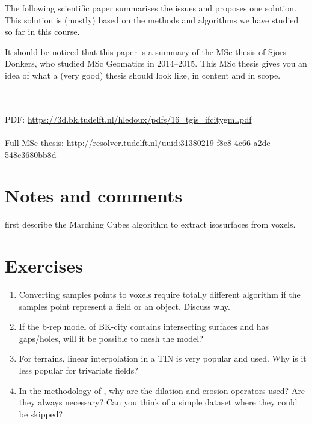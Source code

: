 The following scientific paper summarises the issues and proposes one solution. 
This solution is (mostly) based on the methods and algorithms we have studied so far in this course.

It should be noticed that this paper is a summary of the MSc thesis of Sjors Donkers, who studied MSc Geomatics in 2014--2015.
This MSc thesis gives you an idea of what a (very good) thesis should look like, in content and in scope.

\begin{kaobox}[frametitle=\faExternalLink\ To read or to watch.]
  \\ \\
  PDF: \url{https://3d.bk.tudelft.nl/hledoux/pdfs/16_tgis_ifcitygml.pdf}
  \\ \\
  Full MSc thesis: \url{http://resolver.tudelft.nl/uuid:31380219-f8e8-4c66-a2dc-548c3680bb8d}
\end{kaobox}

%
\section{Notes and comments}

\citet{Lorensen87} first describe the Marching Cubes algorithm to extract isosurfaces from voxels.

%
\section{Exercises}

\begin{enumerate}
  \item Converting samples points to voxels require totally different algorithm if the samples point represent a field or an object. Discuss why.
  \item If the b-rep model of BK-city contains intersecting surfaces and has gaps/holes, will it be possible to mesh the model?
  \item For terrains, linear interpolation in a TIN is very popular and used. Why is it less popular for trivariate fields?
  \item In the methodology of \citet{Donkers16}, why are the dilation and erosion operators used? Are they always necessary? Can you think of a simple dataset where they could be skipped?
\end{enumerate}
